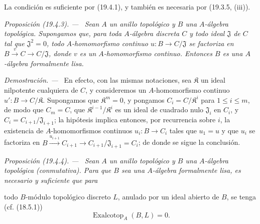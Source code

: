 \documentclass[10pt,oneside]{book}
\makeatletter
\newcommand{\setmanualcurrentlabel}[1]{\def\@currentlabel{#1}}
\newcommand{\oldpage}[2][]{%
  \setcounter{footnote}{0}%
  \marginpar{\scriptsize\textbf{#1}~|~#2}\ignorespaces}
\newenvironment{proposition}[1][]{%
  \setmanualcurrentlabel{#1}\par\medskip\noindent\itshape Proposición (#1). ---\ }{\par}
\newenvironment{proof}{%
  \par\medskip\noindent\textit{Demostración. ---\ }}{\par}
\makeatother
\begin{document}
La condición es suficiente por (19.4.1), y también es necesaria por
(19.3.5, (iii)).

\begin{proposition}[19.4.3]
\label{0.19.4.3-es}
Sean $A$ un anillo topológico y $B$ una $A$-álgebra topológica. Supongamos
que, para toda $A$-álgebra discreta $C$ y todo ideal $\mathfrak J$ de $C$
tal que $\mathfrak J^2=0$, todo $A$-homomorfismo continuo
$u:B\to C/\mathfrak J$ se factoriza en
$B\xrightarrow{v}C\to C/\mathfrak J$, donde $v$ es un $A$-homomorfismo
continuo. Entonces $B$ es una $A$-álgebra formalmente lisa.
\end{proposition}

\begin{proof}
En efecto, con las mismas notaciones, sea $\mathfrak K$ un ideal nilpotente
cualquiera de $C$, y consideremos un $A$-homomorfismo continuo
$u':B\to C/\mathfrak K$. Supongamos que $\mathfrak K^m=0$, y pongamos
$C_i=C/\mathfrak K^i$ para $1\leq i\leq m$, de modo que $C_m=C$, que
$\mathfrak K^{i-1}/\mathfrak K^i$ es un ideal de cuadrado nulo
$\mathfrak J_i$ en $C_i$, y $C_i=C_{i+1}/\mathfrak J_{i+1}$;
la hipótesis implica entonces, por recurrencia sobre $i$, la existencia de
$A$-homomorfismos continuos $u_i:B\to C_i$ tales que $u_1=u$ y que $u_i$
se factoriza en
$B\xrightarrow{u_{i+1}}C_{i+1}\to C_{i+1}/\mathfrak J_{i+1}=C_i$;
de donde se sigue la conclusión.
\end{proof}

\begin{proposition}[19.4.4]
\label{0.19.4.4-es}
Sean $A$ un anillo topológico y $B$ una $A$-álgebra topológica
(conmutativa). Para que $B$ sea una $A$-álgebra formalmente lisa, es necesario y
suficiente que para

\oldpage[0\textsubscript{IV-1}]{87}

todo $B$-módulo topológico discreto $L$, anulado por un ideal abierto de $B$, se
tenga \textup{(cf. (18.5.1))}
\[
  \operatorname{Exalcotop}_A(B,L)=0.
\]
\end{proposition}
\end{document}

